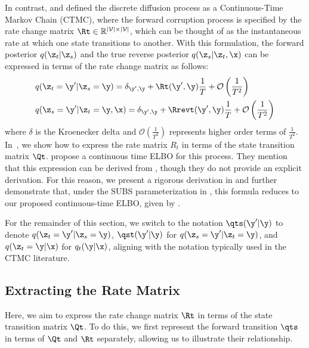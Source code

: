 \documentclass{article} %
\def\onehotset{\mathcal{V}}
\begin{document}
{\begin{appendices}
In contrast, \citet{campbell2022continuous} and \citet{lou2023discrete} defined the discrete diffusion process as a Continuous-Time Markov Chain (CTMC), where the forward corruption process is specified by the rate change matrix $\Rt \in \mathbb{R}^{|\onehotset| \times |\onehotset|}$, which can be thought of as the instantaneous rate at which one state transitions to another. With this formulation, the forward posterior $q(\z_t|\z_s)$ and the true reverse posterior $q(\z_s | \z_t, \x)$ can be expressed in terms of the rate change matrix as follows:
\begin{align}
    & q(\z_t = \y' | \z_s = \y) = \delta_{\y', \y} + \Rt(\y', \y)\frac{1}{T} + \mathcal{O}\left(\frac{1}{T^2}\right) \label{eqn:forward_rate}\\
    & q(\z_s = \y' | \z_t = \y, \x) = \delta_{\y', \y} + \Rrevt(\y', \y)\frac{1}{T} + \mathcal{O}\left(\frac{1}{T^2}\right) \label{eqn:true_reverse_rate}
\end{align}
where $\delta$ is the Kroenecker delta and $\mathcal{O}(\frac{1}{T^2})$ represents higher order terms of $\frac{1}{T^2}$. In~, we show how to express the rate matrix $R_t$ in terms of the state transition matrix $\Qt$.
\citet{lou2023discrete} propose a continuous time ELBO for this process.
They mention that this expression can be derived from \citet{benton2022denoising}, though they do not provide an explicit derivation. For this reason, we present a rigorous derivation in  and further demonstrate that, under the SUBS parameterization in , this formula reduces to our proposed continuous-time ELBO, given by .

For the remainder of this section, we switch to the notation $\qts(\y' | \y)$ to denote $q(\z_t = \y' | \z_s = \y)$, $\qst(\y' | \y)$ for $q(\z_s = \y' | \z_t =\y)$, and $q(\z_t = \y | \x)$ for $q_t(\y | \x)$, aligning with the notation typically used in the CTMC literature.

\subsection{Extracting the Rate Matrix}\label{app:subsec:ctmc_rate_matrix}
Here, we aim to express the rate change matrix $\Rt$ in terms of the state transition matrix $\Qt$. To do this, we first represent the forward transition $\qts$ in terms of $\Qt$ and $\Rt$ separately, allowing us to illustrate their relationship.


\end{appendices}}
\end{document}
